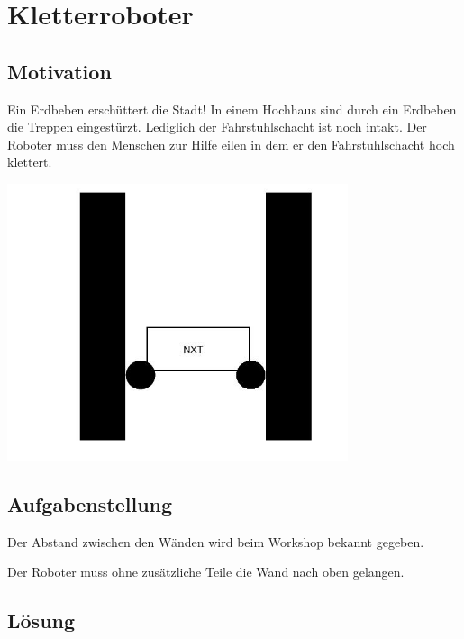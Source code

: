 \chapter{Kletterroboter}
\section{Motivation}
Ein Erdbeben erschüttert die Stadt! In einem Hochhaus sind durch ein Erdbeben die Treppen eingestürzt. Lediglich der Fahrstuhlschacht ist noch intakt. Der Roboter muss den Menschen zur Hilfe eilen in dem er den Fahrstuhlschacht hoch klettert.

\begin{capfigure}[Kletterroboter]
	\includegraphics[width=10cm]{images/klettern_skizze}
\end{capfigure}

\section{Aufgabenstellung}
Der Abstand zwischen den Wänden wird beim Workshop bekannt gegeben.

Der Roboter muss ohne zusätzliche Teile die Wand nach oben gelangen.
\section{Lösung}